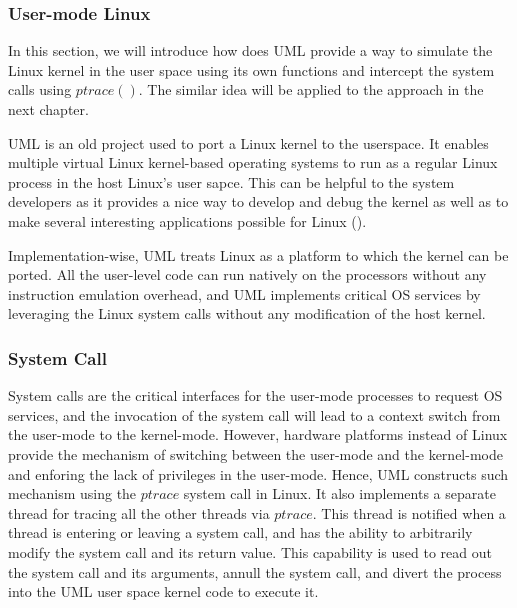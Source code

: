 \subsubsection{User-mode Linux}


In this section, we will introduce how does UML provide a way to simulate the Linux kernel in the user space using its own functions and intercept the system calls using $ptrace()$. The similar idea will be applied to the approach in the next chapter.

UML is an old project used to port a Linux kernel to the userspace. It enables multiple virtual Linux kernel-based operating systems to run as a regular Linux process in the host Linux's user sapce. This can be helpful to the system developers as it provides a nice way to develop and debug the kernel as well as to make several interesting applications possible for Linux (\cite{JD06}). 


Implementation-wise, UML treats Linux as a platform to which the kernel can be ported. All the user-level code can run natively on the processors without any instruction emulation overhead, and UML implements critical OS services by leveraging the Linux system calls without any modification of the host kernel.  

\subsubsection{System Call}


System calls are the critical interfaces for the user-mode processes to request OS services, and the invocation of the system call will lead to a context switch from the user-mode to the kernel-mode. However, hardware platforms instead of Linux provide the mechanism of switching between the user-mode and the kernel-mode and enforing the lack of privileges in the user-mode. Hence, UML constructs such mechanism using the $ptrace$ system call in Linux. It also implements a separate thread for tracing all the other threads via $ptrace$. This thread is notified when a thread is entering or leaving a system call, and has the ability to arbitrarily modify the system call and its return value. This capability is used to read out the system call and its arguments, annull the system call, and divert the process into the UML user space kernel code to execute it.

